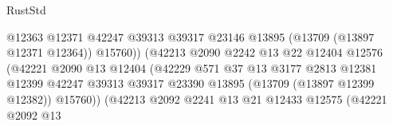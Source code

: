 \begin{lexlean}{RustStd}
\begin{coremodule}
                                                  @12363
                                                  @12371
                                                  @42247
                                                  @39313
                                                  @39317
                                                  @23146
                                                  @13895
                                                  (@13709 (@13897 @12371 @12364))
                                                  @15760))
                                              (@42213
                                                @2090
                                                @2242
                                                @13
                                                @22
                                                @12404
                                                @12576
                                                (@42221
                                                  @2090
                                                  @13
                                                  @12404
                                                  (@42229
                                                    @571
                                                    @37
                                                    @13
                                                    @3177
                                                    @2813
                                                    @12381
                                                    @12399
                                                    @42247
                                                    @39313
                                                    @39317
                                                    @23390
                                                    @13895
                                                    (@13709 (@13897 @12399 @12382))
                                                    @15760))
                                                (@42213
                                                  @2092
                                                  @2241
                                                  @13
                                                  @21
                                                  @12433
                                                  @12575
                                                  (@42221
                                                    @2092
                                                    @13

\end{coremodule}
\end{lexlean}
